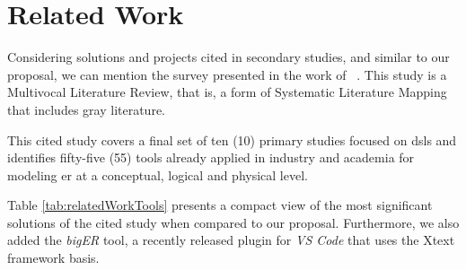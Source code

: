 \section{Related Work} \label{sec_slm:relatedWork}

Considering solutions and projects cited in secondary studies, and similar to our proposal, we can mention the survey presented in the work of ~\cite{eres:2021}.
This study is a Multivocal Literature Review, that is, a form of Systematic Literature Mapping that includes gray literature.

This cited study covers a final set of ten (10) primary studies focused on \acp{dsl} and identifies fifty-five (55) tools already applied in industry and academia for modeling \ac{er} at a conceptual, logical and physical level.

Table \ref{tab:relatedWorkTools} presents a compact view of the most significant solutions of the cited study when compared to our proposal.
Furthermore, we also added the \textit{bigER} tool, a recently released plugin for \textit{VS Code} that uses the Xtext framework basis.

